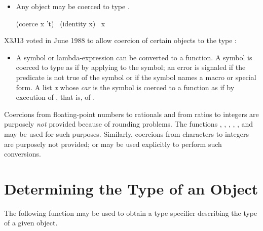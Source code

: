 \begin{defun}[Function]
\begin{itemize}
\begin{lisp}
(coerce 4.5s0 'complex) \EV\ \#C(4.5S0 0.0S0) \\
(coerce 7/2 'complex) \EV\ 7/2 \\
(coerce \#C(7/2 0) '(complex double-float)) \\
~~~\EV\ \#C(3.5D0 0.0D0)
\end{lisp}

\item
Any object may be coerced to type .
\begin{lisp}
(coerce x 't) \EQ\ (identity x) \EQ\ x
\end{lisp}

\end{itemize}

\begin{newer}
X3J13 voted in June 1988 
to allow coercion of certain objects to the type :
\begin{itemize}
\item
A symbol or lambda-expression can be converted to a function.
A symbol is coerced to type  as if by applying
 to the symbol; an error is signaled if the predicate
 is not true of
the symbol or if the symbol names a macro or special form.
A list \emph{x} whose \emph{car} is the symbol 
is coerced to a function as if by execution of ,
that is, of .
\end{itemize}
\end{newer}

Coercions from floating-point numbers to rationals and from ratios
to integers are purposely \emph{not} provided because of rounding
problems.  The functions , ,
, , , and  may be used for
such purposes.  Similarly, coercions from characters to integers
are purposely not provided;  or  may be
used explicitly to perform such conversions.
\end{defun}

\section{Determining the Type of an Object}

The following function may be used to obtain a type specifier
describing the type of a given object.

